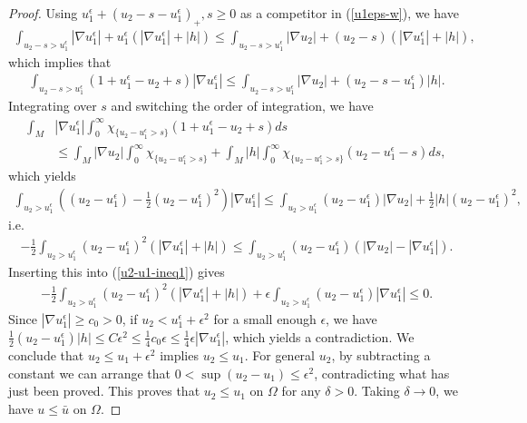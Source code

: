 \documentclass[11pt, letterpaper]{amsart}
\theoremstyle{definition}
\theoremstyle{remark}
\begin{document}
\begin{appendix}
\begin{proof}
Using $u_1 ^{\epsilon } + (u_2 - s - u_1 ^{\epsilon })_{+}, s \geq 0$ as a competitor in (\ref{u1eps-w}), we have
\begin{align*}
	\int_{u_2-s> u_1 ^{\epsilon }} |\nabla u_1 ^{\epsilon }| + u_1 ^{\epsilon }\left( |\nabla u_1 ^{\epsilon }| + |h| \right) \leq \int_{u_2-s> u_1 ^{\epsilon }} |\nabla u_2| + (u_2-s) \left( |\nabla u_1 ^{\epsilon }| + |h| \right), 
\end{align*} 
which implies that
\begin{align*}
	\int_{u_2-s> u_1 ^{\epsilon }} \left( 1+ u_1 ^{\epsilon } - u_2 + s \right) |\nabla u_1 ^{\epsilon }| \leq  \int_{u_2-s> u_1 ^{\epsilon }} |\nabla u_2| + (u_2 - s - u_1 ^{\epsilon } ) |h|.
\end{align*} 
Integrating over $s$ and switching the order of integration, we have
\begin{align*}
	\int_{M} & |\nabla u_1 ^{\epsilon }| \int_{0}^{\infty} \chi _{\{ u_2- u_1 ^{\epsilon }> s\} }  (1+ u_1 ^{\epsilon } - u_2 + s) ds \\
	&\leq \int_{M} |\nabla u_2| \int_{0}^{\infty} \chi _{\{ u_2- u_1 ^{\epsilon }> s\} } + \int_{M} |h| \int_{0}^{\infty} \chi _{\{u_2- u_1 ^{\epsilon }> s\} }(u_2-u_1^{\epsilon }-s) ds,
\end{align*} 
which yields
\begin{align*}
	\int_{u_2> u_1 ^{\epsilon }} \left( (u_2- u_1 ^{\epsilon }) - \frac{1}{2} (u_2-u_1 ^{\epsilon })^2 \right)  |\nabla u_1 ^{\epsilon }| \leq 
	\int_{u_2> u_1 ^{\epsilon }} (u_2- u_1 ^{\epsilon }) |\nabla u_2|+  \frac{1}{2}|h| (u_2- u_1 ^{\epsilon })^2,
\end{align*} 
i.e.
\begin{align*}
	-\frac{1}{2} \int_{u_2> u_1 ^{\epsilon }} (u_2- u_1 ^{\epsilon })^2 \left( |\nabla u_1 ^{\epsilon }| + |h| \right)  \leq \int_{u_2 > u_1 ^{\epsilon }} (u_2 - u_1 ^{\epsilon }) \left( |\nabla u_2| - |\nabla u_1 ^{\epsilon }| \right) .
\end{align*} 
Inserting this into (\ref{u2-u1-ineq1}) gives
\begin{align}\label{u2-u1-final}
	-\frac{1}{2} \int_{u_2> u_1 ^{\epsilon }} (u_2- u_1 ^{\epsilon })^2 \left( |\nabla u_1 ^{\epsilon }| + |h| \right) + \epsilon \int_{u_2> u_1 ^{\epsilon }} \left( u_2- u_1 ^{\epsilon } \right) |\nabla u_1 ^{\epsilon }| \leq 0.
\end{align} 
Since $|\nabla u_1 ^{\epsilon }| \geq c_0>0$, if $u_2< u_1 ^{\epsilon } + \epsilon ^2$ for a small enough $\epsilon $, we have $\frac{1}{2} (u_2- u_1 ^{\epsilon }) |h| \leq C \epsilon ^2 \leq \frac{1}{4} c_0 \epsilon \leq \frac{1}{4} \epsilon |\nabla u_1 ^{\epsilon }| $, which yields a contradiction. We conclude that $u_2 \leq u_1 + \epsilon ^2$ implies $u_2 \leq u_1$. For general $u_2$, by subtracting a constant we can arrange that $0< \sup (u_2- u_1) \leq \epsilon ^2$, contradicting what has just been proved. This proves that $u_2 \leq u_1$ on $\Omega $ for any $\delta >0$. Taking $\delta \to 0$, we have $u \leq \bar{u}$ on $\Omega $.


\end{proof}
\end{appendix}
\end{document}

